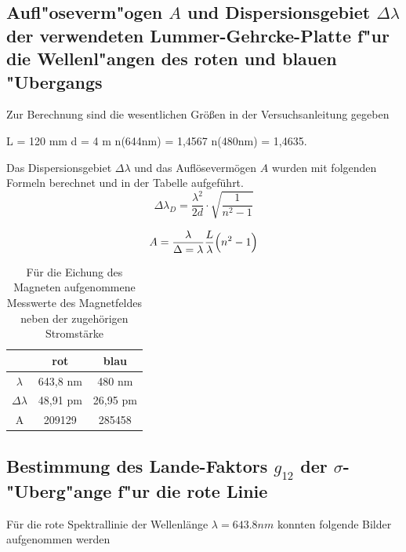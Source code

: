   \subsection{\texorpdfstring{Aufl"oseverm"ogen $A$ und Dispersionsgebiet $\Delta \lambda$ der verwendeten Lummer-Gehrcke-Platte f"ur die Wellenl"angen des roten und blauen "Ubergangs}{Aufl"oseverm"ogen A und Dispersionsgebiet Delta lambda der verwendeten Lummer-Gehrcke-Platte f"ur die Wellenl"angen des roten und blauen "Ubergangs}}
  
  Zur Berechnung sind die wesentlichen Größen in der Versuchsanleitung gegeben
  
  \begin{center}
  L = 120 mm
  d = 4 m
  n(644nm) = 1,4567
  n(480nm) = 1,4635.
  \end{center}
Das Dispersionsgebiet $\Delta \lambda$ und das Auflösevermögen $A$ wurden mit folgenden Formeln berechnet und in der Tabelle aufgeführt.
  \begin{equation}
\Delta \lambda_D=\frac{\lambda^2}{2d}\cdot \sqrt{\frac{1}{n^2-1}}
\end{equation}

\begin{equation}
A=\frac{\lambda}{\Delta = \lambda}\frac{L}{\lambda}\Bigl(n^2-1\Bigr)
\end{equation}

  
    \begin{table}[H] 
	\centering
	\caption{Für die Eichung des Magneten aufgenommene Messwerte des Magnetfeldes neben der zugehörigen Stromstärke} 
	\begin{tabular}{c|c|c}

  & rot & blau\\ 
\hline 
$\lambda$	 		& 643,8 nm & 480 nm \\
$\Delta \lambda $	& 48,91 pm & 26,95 pm \\
A				& 209129 & 285458 \\

		
	\end{tabular} 
	  \label{tab:mit2}
\end{table} 
  \newpage
    \subsection{\texorpdfstring{Bestimmung des Lande-Faktors $g_{12}$ der $\sigma$-"Uberg"ange f"ur die rote Linie}{Bestimmung des Lande-Faktors g_{12} der sigma-"Uberg"ange f"ur die rote Linie}}
    
    Für die rote Spektrallinie der Wellenlänge $\lambda = 643.8 nm$ konnten folgende Bilder aufgenommen werden
    
